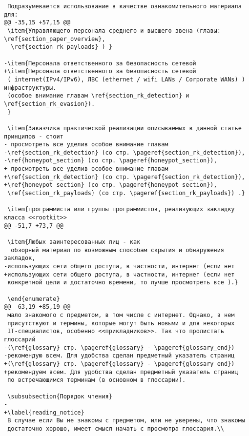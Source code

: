 \begin{verbatim}
 Подразумевается использование в качестве ознакомительного материала для:
@@ -35,15 +57,15 @@
 \item{Управляющего персонала среднего и высшего звена (главы: \ref{section_paper_overview},
  \ref{section_rk_payloads} ) }

-\item{Персонала ответственного за безопасность сетевой
+\item{Персонала ответственного за безопасность сетевой
 ( internet(IPv4/IPv6), ЛВС (ethernet / wifi LANs / Corporate WANs) ) инфраструктуры.
 (особое внимание главам \ref{section_rk_detection} и \ref{section_rk_evasion}).
 }

 \item{Заказчика практической реализации описываемых в данной статье принципов - стоит
- просмотреть все уделив особое внимание главам
-\ref{section_rk_detection} (со стр. \pageref{section_rk_detection}),
-\ref{honeypot_section} (со стр. \pageref{honeypot_section}),
+ просмотреть все уделив особое внимание главам
+\ref{section_rk_detection} (со стр. \pageref{section_rk_detection}),
+\ref{honeypot_section} (со стр. \pageref{honeypot_section}),
 \ref{section_rk_payloads} (со стр. \pageref{section_rk_payloads}) .}

 \item{программиста или группы программистов, реализующих закладку класса <<rootkit>>
@@ -51,7 +73,7 @@

 \item{Любых заинтересованных лиц - как
  обзорный материал по возможным способам скрытия и обнаружения закладок,
-использующих сети общего доступа, в частности, интернет (если нет
+использующих сети общего доступа, в частности, интернет (если нет
 конкретной цели и достаточно времени, то лучше просмотреть все ).}

 \end{enumerate}
@@ -63,19 +85,19 @@
 мало знакомого с предметом, в том числе с интернет. Однако, в нем
 присутствуют и термины, которые могут быть новыми и для некоторых
 IT-специалистов, особенно <<прикладников>>. Так что пролистать глоссарий
-(\ref{glossary} стр. \pageref{glossary} - \pageref{glossary_end})
-рекомендую всем. Для удобства сделан предметный указатель страниц
+(\ref{glossary} стр. \pageref{glossary} - \pageref{glossary_end})
+рекомендуем всем. Для удобства сделан предметный указатель страниц
 по встречающимся терминам (в основном в глоссарии).

 \subsubsection{Порядок чтения}
-
+\label{reading_notice}
 В случае если Вы не знакомы с предметом, или не уверены, что знакомы
 достаточно хорошо, имеет смысл начать с просмотра глоссария.\\


\end{verbatim}
